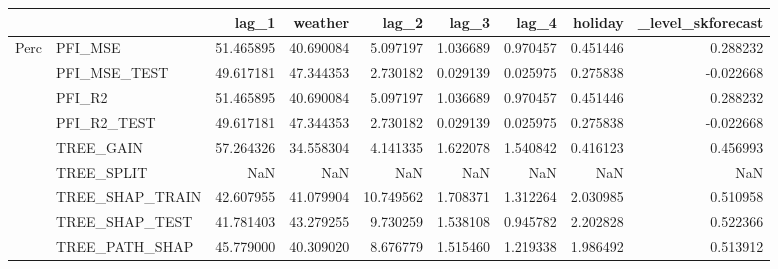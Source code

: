 \begin{tabular}{llrrrrrrr}
\toprule
 &  & lag_1 & weather & lag_2 & lag_3 & lag_4 & holiday & _level_skforecast \\
\midrule
\multirow[t]{9}{*}{Perc} & PFI_MSE & 51.465895 & 40.690084 & 5.097197 & 1.036689 & 0.970457 & 0.451446 & 0.288232 \\
 & PFI_MSE_TEST & 49.617181 & 47.344353 & 2.730182 & 0.029139 & 0.025975 & 0.275838 & -0.022668 \\
 & PFI_R2 & 51.465895 & 40.690084 & 5.097197 & 1.036689 & 0.970457 & 0.451446 & 0.288232 \\
 & PFI_R2_TEST & 49.617181 & 47.344353 & 2.730182 & 0.029139 & 0.025975 & 0.275838 & -0.022668 \\
 & TREE_GAIN & 57.264326 & 34.558304 & 4.141335 & 1.622078 & 1.540842 & 0.416123 & 0.456993 \\
 & TREE_SPLIT & NaN & NaN & NaN & NaN & NaN & NaN & NaN \\
 & TREE_SHAP_TRAIN & 42.607955 & 41.079904 & 10.749562 & 1.708371 & 1.312264 & 2.030985 & 0.510958 \\
 & TREE_SHAP_TEST & 41.781403 & 43.279255 & 9.730259 & 1.538108 & 0.945782 & 2.202828 & 0.522366 \\
 & TREE_PATH_SHAP & 45.779000 & 40.309020 & 8.676779 & 1.515460 & 1.219338 & 1.986492 & 0.513912 \\
\cline{1-9}
\bottomrule
\end{tabular}
